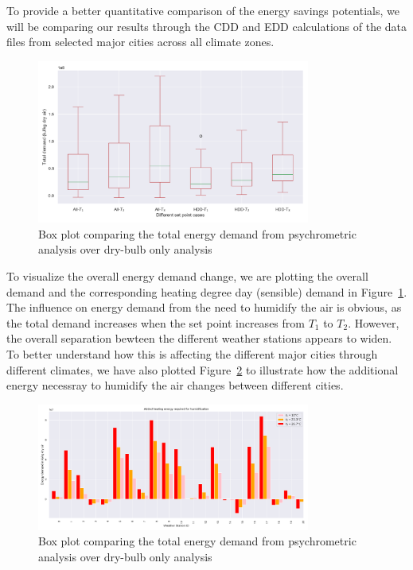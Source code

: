 	To provide a better quantitative comparison of the energy savings potentials, we will be comparing our results through the CDD and EDD calculations of the data files from selected major cities across all climate zones.

	\begin{figure}[h!]
	\centering
	\includegraphics[width=0.8\textwidth]{boxheat.png}
	\caption{Box plot comparing the total energy demand from psychrometric analysis over dry-bulb only analysis}\label{fg:heatall}
	\end{figure}

	To visualize the overall energy demand change, we are plotting the overall demand and the corresponding heating degree day (sensible) demand in Figure~\ref{fg:heatall}. The influence on energy demand from the need to humidify the air is obvious, as the total demand increases when the set point increases from $T_1$ to $T_2$. However, the overall separation bewteen the different weather stations appears to widen. To better understand how this is affecting the different major cities through different climates, we have also plotted Figure~\ref{fg:heatcities} to illustrate how the additional energy necessray to humidify the air changes between different cities.

	\begin{figure}[h!]
	\centering
	\includegraphics[width=0.8\textwidth]{heatsave.png}
	\caption{Box plot comparing the total energy demand from psychrometric analysis over dry-bulb only analysis}\label{fg:heatcities}
	\end{figure}

